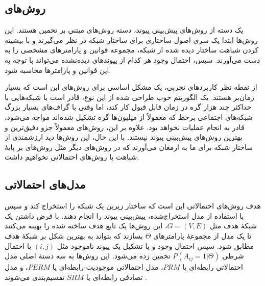 \subsection{روش‌های \MaximumLikelihood}
یک دسته از روش‌های پیش‌بینی پیوند، دسته روش‌های مبتنی بر تخمین \MaximumLikelihood هستند. این روش‌ها ابتدا یک سری اصول ساختاری برای ساختار شبکه در نظر می‌گیرند و با بیشینه کردن شباهت ساختار دیده شده از شبکه، مجموعه قوانین و پارامترهای مشخصی را به دست می‌آورند. سپس، احتمال وجود هر کدام از پیوندهای دیده‌نشده می‌تواند با توجه به این قوانین و پارامترها محاسبه شود.

از نقطه نظر کاربردهای تجربی، یک مشکل اساسی برای روش‌های \MaximumLikelihood این است که بسیار زمان‌بر هستند. یک الگوریتم خوب طراحی شده از این نوع، قادر است با شبکه‌هایی با حداکثر چند هزار گره در زمان قابل قبول کار کند، اما وقتی با گراف‌های بسیار بزرگ شبکه‌های اجتماعی برخط که معمولاً از میلیون‌ها گره تشکیل شده‌اند مواجه می‌شود، قادر به انجام عملیات نخواهد بود. علاوه بر این، روش‌های \MaximumLikelihood معمولاً جزو دقیق‌ترین و بهترین روش‌های پیش‌بینی پیوند نیستند. با این حال، این روش‌ها دید ارزشمندی از ساختار شبکه برای ما به ارمغان می‌آورند که در روش‌های دیگر مثل روش‌های بر پایهٔ شباهت یا روش‌های احتمالاتی نخواهیم داشت.

\subsection{مدل‌های احتمالاتی}
هدف روش‌های احتمالاتی این است که ساختار زیرین یک شبکه را استخراج کند و سپس با استفاده از مدل استخراج‌شده، پیش‌بینی پیوند را انجام دهند. با فرض داشتن یک شبکهٔ هدف مثل $G=(V,E)$، این روش‌ها یک تابع هدف ساخته شده را بهینه می‌کنند تا یک مدل از مجموعهٔ پارامترهای $\Theta$ بسازند که بتواند به بهترین شکل بر شبکهٔ هدف مطابق شود. سپس احتمال وجود و یا تشکیل یک پیوند ناموجود مثل $(i,j)$ با احتمال شرطی
$P(A_{ij}=1|\Theta)$
تخمین زده می‌شود. این روش‌ها به سه دستهٔ اصلی مدل احتمالاتی رابطه‌ای یا $PRM$، مدل احتمالاتی موجودیت-رابطه‌ای یا $PERM$، و مدل تصادفی رابطه‌ای یا $SRM$ تقسیم‌بندی می‌شوند \cite{friedman1999learning}.

